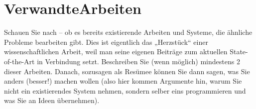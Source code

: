\chapter{VerwandteArbeiten}

Schauen Sie nach – ob es bereits existierende Arbeiten und Systeme, die ähnliche Probleme bearbeiten gibt. Dies ist eigentlich das „Herzstück“ einer wissenschaftlichen Arbeit, weil man seine eigenen Beiträge zum aktuellen State-of-the-Art in  
Verbindung setzt.  
Beschreiben Sie (wenn möglich) mindestens 2 dieser Arbeiten. Danach, sozusagen als Resümee können Sie dann sagen, was Sie anders (besser!) machen wollen (also hier kommen Argumente hin, warum Sie nicht ein existierendes System nehmen, sondern selber eins programmieren und was Sie an Ideen übernehmen).  

